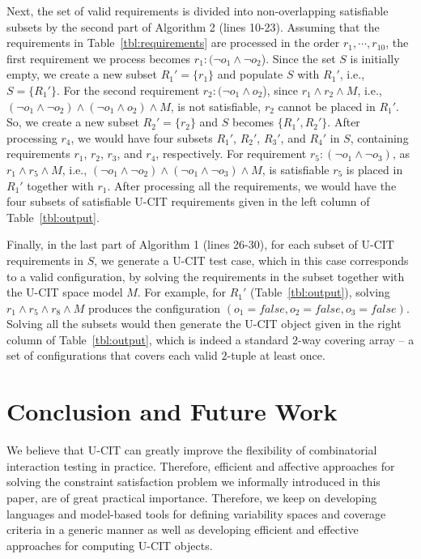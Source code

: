 \documentclass[EPiC]{easychair}
\begin{document}
Next, the set of valid requirements is divided into non-overlapping satisfiable  subsets by the second part of Algorithm 2 (lines 10-23). Assuming that the requirements in Table~\ref{tbl:requirements} are processed in the order $r_1, \cdots, r_{10}$, the first requirement we process becomes $r_1: (\neg o_1 \wedge \neg o_2$). Since the set $S$ is initially empty, we create a new subset $R_1' = \{r_1\}$ and populate $S$ with $R_1'$, i.e., $S=\{R_1'\}$. For the second requirement $r_2: (\neg o_1 \wedge o_2$), since $r_1 \wedge r_2 \wedge M$, i.e., $(\neg o_1 \wedge \neg o_2) \wedge (\neg o_1 \wedge o_2) \wedge M$, is not satisfiable, $r_2$ cannot be placed in $R_1'$. So, we create a new subset $R_2'=\{r_2\}$ and $S$ becomes $\{R_1', R_2'\}$. After processing $r_4$, we would have four subsets $R_1'$, $R_2'$, $R_3'$, and $R_4'$ in $S$, containing requirements $r_1$, $r_2$, $r_3$, and $r_4$, respectively. For requirement $r_5: (\neg o_1 \wedge \neg o_3)$, as $r_1 \wedge r_5 \wedge M$, i.e., $(\neg o_1 \wedge \neg o_2) \wedge (\neg o_1 \wedge \neg o_3) \wedge M$, is satisfiable $r_5$ is placed in $R_1'$ together with $r_1$. After processing all the requirements, we would have the four subsets of satisfiable U-CIT requirements given in the left column of Table~\ref{tbl:output}.
 
Finally, in the last part of Algorithm 1 (lines 26-30), for each subset of U-CIT requirements in $S$, we generate a U-CIT test case, which in this case corresponds to a valid configuration, by solving the requirements in the subset together with the U-CIT space model $M$. For example, for $R_1'$ (Table~\ref{tbl:output}), solving $r_1 \wedge r_5 \wedge r_8 \wedge M$ produces the configuration $(o_1=false, o_2=false, o_3=false)$. Solving all the subsets would then generate the U-CIT object given in the right column of Table~\ref{tbl:output}, which is indeed a standard $2$-way covering array -- a set of configurations that covers each valid $2$-tuple at least once.

\section{Conclusion and Future Work} \label{conclusion}

We believe that U-CIT can greatly improve the flexibility of combinatorial interaction testing in practice. Therefore, efficient and affective approaches for solving the constraint satisfaction problem we informally introduced in this paper, are of great practical importance. Therefore, we keep on developing languages and model-based tools for defining variability spaces and coverage criteria in a generic manner as well as developing efficient and effective approaches for computing U-CIT objects.





\end{document}

